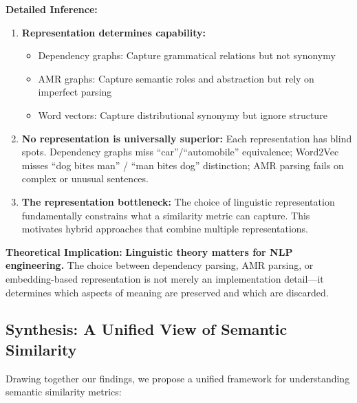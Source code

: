 \documentclass[11pt,a4paper]{article}
\begin{document}
\textbf{Detailed Inference:}
\begin{enumerate}
    \item \textbf{Representation determines capability:}
    \begin{itemize}
        \item Dependency graphs: Capture grammatical relations but not synonymy
        \item AMR graphs: Capture semantic roles and abstraction but rely on imperfect parsing
        \item Word vectors: Capture distributional synonymy but ignore structure
    \end{itemize}
    
    \item \textbf{No representation is universally superior:} Each representation has blind spots. Dependency graphs miss ``car''/``automobile'' equivalence; Word2Vec misses ``dog bites man'' / ``man bites dog'' distinction; AMR parsing fails on complex or unusual sentences.
    
    \item \textbf{The representation bottleneck:} The choice of linguistic representation fundamentally constrains what a similarity metric can capture. This motivates hybrid approaches that combine multiple representations.
\end{enumerate}

\textbf{Theoretical Implication:} \textbf{Linguistic theory matters for NLP engineering.} The choice between dependency parsing, AMR parsing, or embedding-based representation is not merely an implementation detail---it determines which aspects of meaning are preserved and which are discarded.

\subsection{Synthesis: A Unified View of Semantic Similarity}

Drawing together our findings, we propose a unified framework for understanding semantic similarity metrics:
\end{document}
